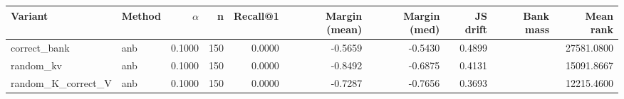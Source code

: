 \begin{tabular}{l l r r r r r r r r}
\toprule
Variant & Method & $\alpha$ & n & Recall@1 & Margin (mean) & Margin (med) & JS drift & Bank mass & Mean rank \\
\midrule
correct\_bank & anb & 0.1000 & 150 & 0.0000 & -0.5659 & -0.5430 & 0.4899 &  & 27581.0800 \\
random\_kv & anb & 0.1000 & 150 & 0.0000 & -0.8492 & -0.6875 & 0.4131 &  & 15091.8667 \\
random\_K\_correct\_V & anb & 0.1000 & 150 & 0.0000 & -0.7287 & -0.7656 & 0.3693 &  & 12215.4600 \\
\bottomrule
\end{tabular}
